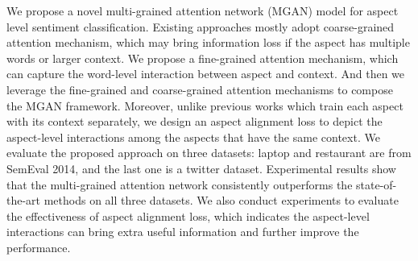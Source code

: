 We propose a novel multi-grained attention network (MGAN) model for aspect level sentiment classification. Existing approaches mostly adopt coarse-grained attention mechanism, which may bring information loss if the aspect has multiple words or larger context. We propose a fine-grained attention mechanism, which can capture the word-level interaction between aspect and context. And then we leverage the fine-grained and coarse-grained attention mechanisms to compose the MGAN framework. Moreover, unlike previous works which train each aspect with its context separately, we design an aspect alignment loss to depict the aspect-level interactions among the aspects that have the same context. We evaluate the proposed approach on three datasets: laptop and restaurant are from SemEval 2014, and the last one is a twitter dataset. Experimental results show that the multi-grained attention network consistently outperforms the state-of-the-art methods on all three datasets. We also conduct experiments to evaluate the effectiveness of aspect alignment loss, which indicates the aspect-level interactions can bring extra useful information and further improve the performance.
